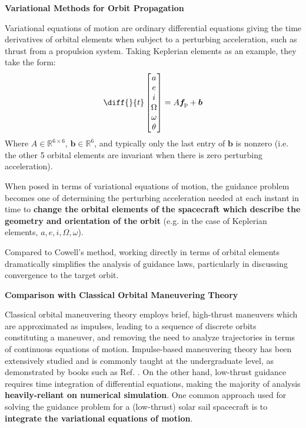 \textbf{Variational Methods for Orbit Propagation}

Variational equations of motion are ordinary differential equations giving the time derivatives of orbital elements when subject to a perturbing acceleration, such as thrust from a propulsion system. Taking Keplerian elements as an example, they take the form:
\begin{equation*}
  \diff{}{t}
  \begin{bmatrix}
    a \\e\\i\\ \Omega \\ \omega \\ \theta
  \end{bmatrix}
  = A \boldsymbol{f}_\mathrm{p} + \boldsymbol{b}
\end{equation*}
Where $A \in \mathbb{R}^{6\times6}$, $\boldsymbol{b} \in  \mathbb{R}^{6}$, and typically only the last entry of $\boldsymbol{b}$ is nonzero (i.e. the other 5 orbital elements are invariant when there is zero perturbing acceleration).

When posed in terms of variational equations of motion, the guidance problem becomes one of determining the perturbing acceleration needed at each instant in time to \textbf{change the orbital elements of the spacecraft which describe the geometry and orientation of the orbit} (e.g. in the case of Keplerian elements, $a, e, i , \Omega, \omega$).

Compared to Cowell's method, working directly in terms of orbital elements dramatically simplifies the analysis of guidance laws, particularly in discussing convergence to the target orbit.

\textbf{Comparison with Classical Orbital Maneuvering Theory}

Classical orbital maneuvering theory employs brief, high-thrust maneuvers which are approximated as impulses, leading to a sequence of discrete orbits constituting a maneuver, and removing the need to analyze trajectories in terms of continuous equations of motion. Impulse-based maneuvering theory has been extensively studied and is commonly taught at the undergraduate level, as demonstrated by books such as Ref. \cite{book:1487513}. On the other hand, low-thrust guidance requires time integration of differential equations, making the majority of analysis \textbf{heavily-reliant on numerical simulation}. One common approach used for solving the guidance problem for a (low-thrust) solar sail spacecraft is to \textbf{integrate the variational equations of motion}.

